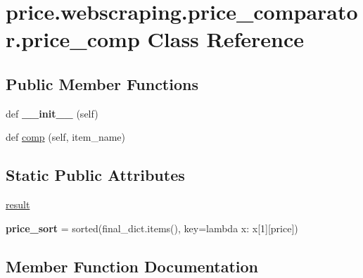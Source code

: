 \hypertarget{classprice_1_1webscraping_1_1price__comparator_1_1price__comp}{}\section{price.\+webscraping.\+price\+\_\+comparator.\+price\+\_\+comp Class Reference}
\label{classprice_1_1webscraping_1_1price__comparator_1_1price__comp}
\subsection*{Public Member Functions}
\begin{DoxyCompactItemize}
\item 
\mbox{\label{classprice_1_1webscraping_1_1price__comparator_1_1price__comp_ac1ce70aec6be2853b2aaeb5e0c6f049f}} 
def {\bfseries \+\_\+\+\_\+init\+\_\+\+\_\+} (self)
\item 
def \hyperlink{classprice_1_1webscraping_1_1price__comparator_1_1price__comp_ae28f7742b35d881dd1cc5335f9a87a3c}{comp} (self, item\+\_\+name)
\end{DoxyCompactItemize}
\subsection*{Static Public Attributes}
\begin{DoxyCompactItemize}
\item 
\hyperlink{classprice_1_1webscraping_1_1price__comparator_1_1price__comp_a0df412f91db90a50a11c6e2f80adc7d5}{result}
\item 
\mbox{\label{classprice_1_1webscraping_1_1price__comparator_1_1price__comp_a4af5671abb4bf8fde8fcf658b930f02d}} 
{\bfseries price\+\_\+sort} = sorted(final\+\_\+dict.\+items(), key=lambda x\+: x\mbox{[}1\mbox{]}\mbox{[}\textquotesingle{}price\textquotesingle{}\mbox{]})
\end{DoxyCompactItemize}


\subsection{Member Function Documentation}
\mbox{\label{classprice_1_1webscraping_1_1price__comparator_1_1price__comp_ae28f7742b35d881dd1cc5335f9a87a3c}} 
